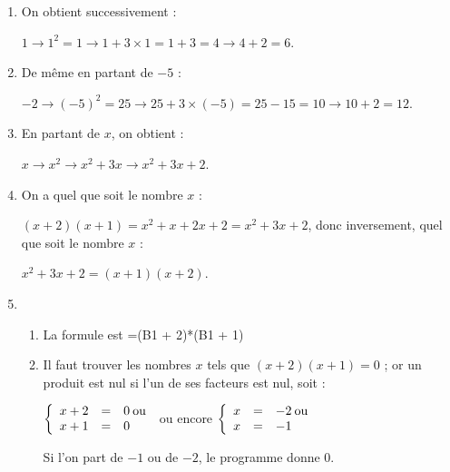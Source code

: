 
\medskip

\begin{enumerate}
\item On obtient successivement :

$1 \to 1^2 = 1 \to 1 + 3 \times 1 = 1 + 3 = 4 \to 4 + 2 = 6$. 
\item De même en partant de $- 5$ : 

$- 2 \to (- 5)^2 = 25 \to 25 + 3 \times (- 5) = 25 - 15 = 10 \to 10 + 2 = 12$.
\item En partant de $x$, on obtient :

$x \to x^2 \to x^2 + 3x \to x^2 + 3x + 2$.
\item On a quel que soit le nombre $x$ : 

$(x + 2)(x + 1) = x^2 + x + 2x + 2 = x^2 + 3x + 2$, donc inversement, quel que soit le nombre $x$ :

$x^2 + 3x + 2 = (x + 1)(x + 2)$.
\item
	\begin{enumerate}
		\item La formule est =(B1 + 2)*(B1 + 1)
		\item Il faut trouver les nombres $x$ tels que $(x + 2)(x + 1) = 0$ ; or un produit est nul si l'un de ses facteurs est nul, soit :
		
		$\left\{\begin{array}{l c l}
		x + 2&=&0 \:\text{ou}\\
		x + 1&=&0
		\end{array}\right.$ ou encore $\left\{\begin{array}{l c l}
		x &=&- 2\:\text{ou}\\
		x &=&- 1
		\end{array}\right.$
		
Si l'on part de $- 1$ ou de $- 2$, le programme donne $0$.
	\end{enumerate}
\end{enumerate}

\vspace{0,5cm}

